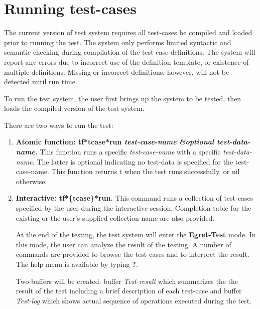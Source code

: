 \section {Running test-cases}

The current version of  test system requires all test-cases 
be compiled and loaded prior to running the test. The system
only performs limited syntactic and semantic checking during 
compilation of the test-case definitions.  The system will report
any errors due to incorrect use of the definition template,
or existence of multiple definitions.  Missing or incorrect
definitions, however, will not be detected until run time.

\noindent To run the test system, the user first brings up the system
to be tested, then loads the compiled version of the 
test system.

\noindent There are two ways to run the test:
\begin {enumerate}

\item {\bf Atomic function: tf*tcase*run {\it test-case-name} {\it \&optional test-data-name.}}
This function runs a specific {\it test-case-name} with a specific
{\it test-data-name}.  The latter is optional indicating no test-data
is specified for the  test-case-name.
This function returns t when the test runs successfully, or nil otherwise.

\item {\bf Interactive: tf*\{tcase\}*run.}
This command runs a collection of test-cases specified by the
user during the interactive session.  Completion table for the existing
or the user's supplied collection-name are also provided.  

At the end of the testing, the test system will enter the 
{\bf Egret-Test} mode.
In this mode, the user can analyze the result of the testing. A number
of commands are provided to browse the test cases and to interpret the
result. The help menu is available by typing {\bf ?}.

Two buffers will be created: buffer {\it Test-result} which summarizes the
the result of the test including a brief description of each test-case
and buffer {\it Test-log} which shows actual sequence of operations
executed  during the test. 
\end {enumerate}




